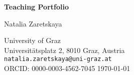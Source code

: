 \begin{titlepage}
    \centering
    \vspace*{2cm}
    {\Huge\bfseries Teaching Portfolio\par}
    \vspace{2cm}
    {\Large Natalia Zaretskaya\par}
    \vspace{0.5cm}
    University of Graz\\
    Universitätsplatz 2, 8010 Graz, Austria\\
    \texttt{natalia.zaretskaya@uni-graz.at}\\
    ORCID: 0000-0003-4562-7045
    \vfill
    \today
\end{titlepage}